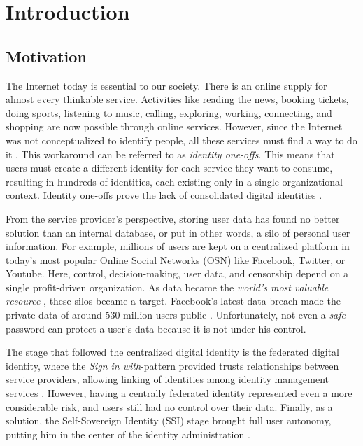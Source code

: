 \chapter{Introduction}
\label{cha:introduction}

\section{Motivation}

The Internet today is essential to our society. There is an online supply for almost every thinkable service. Activities like reading the news, booking tickets, doing sports, listening to music, calling, exploring, working, connecting, and shopping are now possible through online services. However, since the Internet was not conceptualized to identify people, all these services must find a way to do it \cite{Tobin_Reed_Windley_Foundation_2017}. This workaround can be referred to as \emph{identity one-offs}. This means that users must create a different identity for each service they want to consume, resulting in hundreds of identities, each existing only in a single organizational context. Identity one-offs prove the lack of consolidated digital identities \cite{macinnis_2019}.

From the service provider's perspective, storing user data has found no better solution than an internal database, or put in other words, a silo of personal user information. For example, millions of users are kept on a centralized platform in today's most popular Online Social Networks (OSN) like Facebook, Twitter, or Youtube. Here, control, decision-making, user data, and censorship depend on a single profit-driven organization. As data became the \emph{world's most valuable resource} \cite{parkins_2017}, these silos became a target. Facebook's latest data breach made the private data of around 530 million users public \cite{holmes_2021}. Unfortunately, not even a \emph{safe} password can protect a user's data because it is not under his control. 

The stage that followed the centralized digital identity is the federated digital identity, where the \emph{Sign in with}-pattern provided trusts relationships between service providers, allowing linking of identities among identity management services \cite{1556498}. However, having a centrally federated identity represented even a more considerable risk, and users still had no control over their data. Finally, as a solution, the Self-Sovereign Identity (SSI) stage brought full user autonomy, putting him in the center of the identity administration \cite{allen_2016}.  

